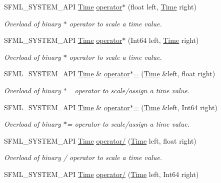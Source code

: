 \begin{DoxyCompactItemize}
S\-F\-M\-L\-\_\-\-S\-Y\-S\-T\-E\-M\-\_\-\-A\-P\-I \hyperlink{classsf_1_1Time}{Time} \hyperlink{classsf_1_1Time_a63723c9e9c5ff6151377ec4350c6f36e}{operator$\ast$} (float left, \hyperlink{classsf_1_1Time}{Time} right)
\begin{DoxyCompactList}\small\item\em Overload of binary $\ast$ operator to scale a time value. \end{DoxyCompactList}\item 
S\-F\-M\-L\-\_\-\-S\-Y\-S\-T\-E\-M\-\_\-\-A\-P\-I \hyperlink{classsf_1_1Time}{Time} \hyperlink{classsf_1_1Time_a40a6d0938fb4a43731d54fd90bfc6476}{operator$\ast$} (Int64 left, \hyperlink{classsf_1_1Time}{Time} right)
\begin{DoxyCompactList}\small\item\em Overload of binary $\ast$ operator to scale a time value. \end{DoxyCompactList}\item 
S\-F\-M\-L\-\_\-\-S\-Y\-S\-T\-E\-M\-\_\-\-A\-P\-I \hyperlink{classsf_1_1Time}{Time} \& \hyperlink{classsf_1_1Time_a8996b6a6fcb8f3854b486b8e43949b50}{operator$\ast$=} (\hyperlink{classsf_1_1Time}{Time} \&left, float right)
\begin{DoxyCompactList}\small\item\em Overload of binary $\ast$= operator to scale/assign a time value. \end{DoxyCompactList}\item 
S\-F\-M\-L\-\_\-\-S\-Y\-S\-T\-E\-M\-\_\-\-A\-P\-I \hyperlink{classsf_1_1Time}{Time} \& \hyperlink{classsf_1_1Time_a6656a0a1a1802009a72d93fbba61f24a}{operator$\ast$=} (\hyperlink{classsf_1_1Time}{Time} \&left, Int64 right)
\begin{DoxyCompactList}\small\item\em Overload of binary $\ast$= operator to scale/assign a time value. \end{DoxyCompactList}\item 
S\-F\-M\-L\-\_\-\-S\-Y\-S\-T\-E\-M\-\_\-\-A\-P\-I \hyperlink{classsf_1_1Time}{Time} \hyperlink{classsf_1_1Time_a3386c392dbc62e51dfa59730854d1ed2}{operator/} (\hyperlink{classsf_1_1Time}{Time} left, float right)
\begin{DoxyCompactList}\small\item\em Overload of binary / operator to scale a time value. \end{DoxyCompactList}\item 
S\-F\-M\-L\-\_\-\-S\-Y\-S\-T\-E\-M\-\_\-\-A\-P\-I \hyperlink{classsf_1_1Time}{Time} \hyperlink{classsf_1_1Time_ab72f2de3e2bb592b4b4008dc1ac79056}{operator/} (\hyperlink{classsf_1_1Time}{Time} left, Int64 right)

\end{DoxyCompactItemize}

